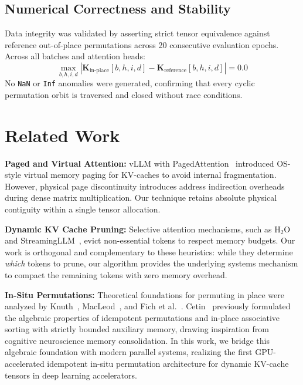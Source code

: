 \documentclass[journal,10pt,twocolumn]{article}
\begin{document}
\subsection{Numerical Correctness and Stability}
Data integrity was validated by asserting strict tensor equivalence against reference out-of-place permutations across 20 consecutive evaluation epochs. Across all batches and attention heads:
\begin{equation}
    \max_{b,h,i,d} |\mathbf{K}_{\text{in-place}}[b,h,i,d] - \mathbf{K}_{\text{reference}}[b,h,i,d]| = 0.0
\end{equation}
No \texttt{NaN} or \texttt{Inf} anomalies were generated, confirming that every cyclic permutation orbit is traversed and closed without race conditions.

\section{Related Work}
\label{sec:related}
\textbf{Paged and Virtual Attention:} vLLM with PagedAttention~\cite{kwon2023efficient} introduced OS-style virtual memory paging for KV-caches to avoid internal fragmentation. However, physical page discontinuity introduces address indirection overheads during dense matrix multiplication. Our technique retains absolute physical contiguity within a single tensor allocation.

\textbf{Dynamic KV Cache Pruning:} Selective attention mechanisms, such as $\text{H}_2\text{O}$~\cite{zhang2023h2o} and StreamingLLM~\cite{xiao2023efficient}, evict non-essential tokens to respect memory budgets. Our work is orthogonal and complementary to these heuristics: while they determine \textit{which} tokens to prune, our algorithm provides the underlying systems mechanism to compact the remaining tokens with zero memory overhead.

\textbf{In-Situ Permutations:} Theoretical foundations for permuting in place were analyzed by Knuth~\cite{knuth1998art}, MacLeod~\cite{macleod1970inversion}, and Fich et al.~\cite{fich1995permuting}. Cetin~\cite{cetin2013idempotent, cetin2013insitu, cetin2013inplace, cetin2012improved} previously formulated the algebraic properties of idempotent permutations and in-place associative sorting with strictly bounded auxiliary memory, drawing inspiration from cognitive neuroscience memory consolidation. In this work, we bridge this algebraic foundation with modern parallel systems, realizing the first GPU-accelerated idempotent in-situ permutation architecture for dynamic KV-cache tensors in deep learning accelerators.
\end{document}
